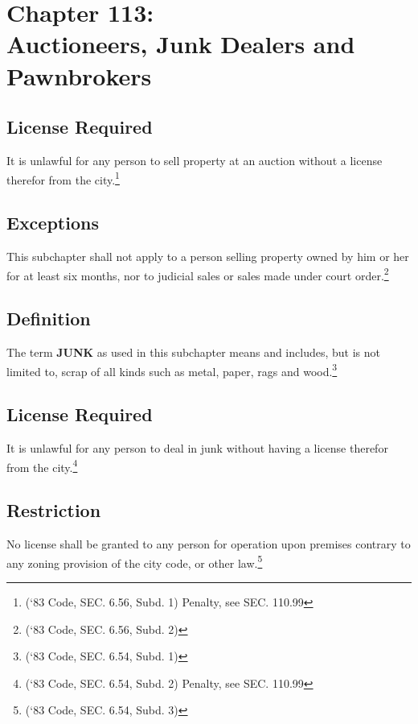 \chapter*{Chapter 113: \\
	Auctioneers, Junk Dealers and Pawnbrokers}
    \vfill
    \minitoc
    \pagebreak


\section{License Required}
It is unlawful for any person to sell property at an auction without a license therefor from the city.\footnote{(‘83 Code, SEC. 6.56, Subd. 1)  Penalty, see SEC. 110.99}

\section{Exceptions}
This subchapter shall not apply to a person selling property owned by him or her for at least six months, nor to judicial sales or sales made under court order.\footnote{(‘83 Code, SEC. 6.56, Subd. 2)}


\setcounter{section}{14}
\section{Definition}
The term \textbf{JUNK} as used in this subchapter means and includes, but is not limited to, scrap of all kinds such as metal, paper, rags and wood.\footnote{(‘83 Code, SEC. 6.54, Subd. 1)}

\section{License Required}
It is unlawful for any person to deal in junk without having a license therefor from the city.\footnote{(‘83 Code, SEC. 6.54, Subd. 2)  Penalty, see SEC. 110.99}

\section{Restriction}
No license shall be granted to any person for operation upon premises contrary to any zoning provision of the city code, or other law.\footnote{(‘83 Code, SEC. 6.54, Subd. 3)}

